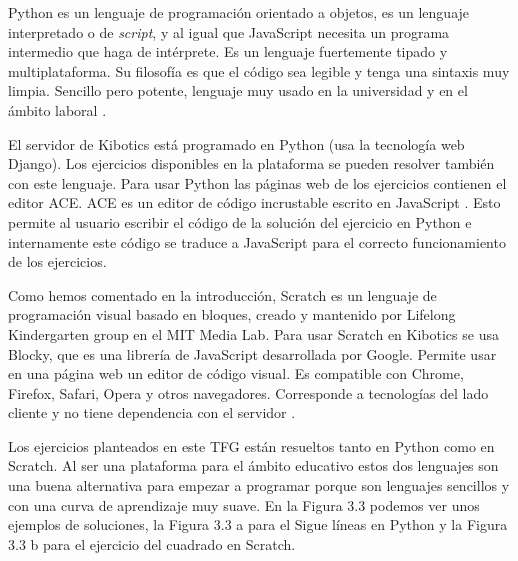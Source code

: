 Python es un lenguaje de programación orientado a objetos, es un lenguaje interpretado o de \textit{script}, y al igual que JavaScript necesita un programa intermedio que haga de intérprete. Es un lenguaje fuertemente tipado y multiplataforma. Su filosofía es que el código sea legible y tenga  una sintaxis muy limpia. Sencillo pero potente, lenguaje muy usado en la universidad y en el ámbito laboral \cite{python}.

El servidor de Kibotics está programado en Python (usa la tecnología web Django). Los ejercicios disponibles en la plataforma se pueden resolver también con este lenguaje. Para usar Python las páginas web de los ejercicios contienen el editor ACE. ACE es un editor de código incrustable escrito en JavaScript \cite{aceeditor}. Esto permite al usuario escribir el código de la solución del ejercicio en Python e internamente este código se traduce a JavaScript para el correcto funcionamiento de los ejercicios. 

Como hemos comentado en la introducción, Scratch es un lenguaje de programación visual basado en bloques, creado y mantenido por Lifelong Kindergarten group en el MIT Media Lab. Para usar Scratch en Kibotics se usa Blocky, que es una librería de JavaScript desarrollada por Google. Permite usar en una página web un editor de código visual. Es compatible con Chrome, Firefox, Safari, Opera y otros navegadores. Corresponde a tecnologías del lado cliente y no tiene dependencia con el servidor \cite{blocky}.


Los ejercicios planteados en este TFG están resueltos tanto en Python como en Scratch. Al ser una plataforma para el ámbito educativo estos dos lenguajes son una buena alternativa para empezar a programar porque son lenguajes sencillos y con una curva de aprendizaje muy suave. En la Figura 3.3 podemos ver unos ejemplos de soluciones, la Figura 3.3 a para el Sigue líneas en Python y la Figura 3.3 b para el ejercicio del cuadrado en Scratch.

